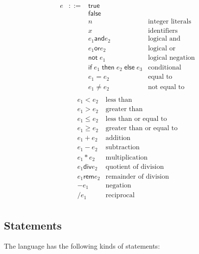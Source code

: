 \documentclass[11pt]{article}
\newcommand{\mathsc}[1]{\bm{\mathsf{#1}}}
\newcommand{\exprtrue}{\mathsc{true}}
\newcommand{\exprfalse}{\mathsc{false}}
\newcommand{\exprand}[2]{#1 \mathbin{\mathsc{and}} #2}
\newcommand{\expror}[2]{#1 \mathbin{\mathsc{or}} #2}
\newcommand{\exprnot}[1]{\mathsc{not}\;#1}
\newcommand{\exprif}[3]{\mathsc{if}\;#1\;\mathsc{then}\;#2\;\mathsc{else}\;#3}
\newcommand{\expreq}[2]{#1 = #2}
\newcommand{\exprne}[2]{#1 \neq #2}
\newcommand{\exprlt}[2]{#1 < #2}
\newcommand{\exprgt}[2]{#1 > #2}
\newcommand{\exprle}[2]{#1 \leq #2}
\newcommand{\exprge}[2]{#1 \geq #2}
\newcommand{\expradd}[2]{#1 + #2}
\newcommand{\exprsub}[2]{#1 - #2}
\newcommand{\exprmul}[2]{#1 * #2}
\newcommand{\exprquo}[2]{#1 \mathbin{\mathsc{div}} #2}
\newcommand{\exprrem}[2]{#1 \mathbin{\mathsc{rem}} #2}
\newcommand{\exprneg}[1]{-#1}
\newcommand{\exprrec}[1]{/#1}
\begin{document}
\begin{multicols}{2}
\[
\begin{array}{lcll}
e &::=& \exprtrue & \\
  &   & \exprfalse & \\
  &   & n & \text{integer literals}\\
  &   & x & \text{identifiers}\\
  &   & \exprand{e_1}{e_2} & \text{logical and}\\
  &   & \expror{e_1}{e_2} &\text{logical or}\\
  &   & \exprnot{e_1} & \text{logical negation}\\
  &   & \exprif{e_1}{e_2}{e_3} & \text{conditional}\\
  &   & \expreq{e_1}{e_2} & \text{equal to}\\
  &   & \exprne{e_1}{e_2} & \text{not equal to}\\
\end{array}
\]
\vfill
\columnbreak
\[
\begin{array}{lll}
        \exprlt{e_1}{e_2} & \text{less than}\\
        \exprgt{e_1}{e_2} & \text{greater than}\\
        \exprle{e_1}{e_2} & \text{less than or equal to}\\
        \exprge{e_1}{e_2} & \text{greater than or equal to}\\
        \expradd{e_1}{e_2} & \text{addition}\\
        \exprsub{e_1}{e_2} & \text{subtraction}\\
        \exprmul{e_1}{e_2} & \text{multiplication}\\
        \exprquo{e_1}{e_2} & \text{quotient of division}\\
        \exprrem{e_1}{e_2} & \text{remainder of division}\\
        \exprneg{e_1} & \text{negation}\\
        \exprrec{e_1} & \text{reciprocal}\\
\end{array}
\]
\end{multicols}


\subsection{Statements}

The language has the following kinds of statements:
\end{document}
